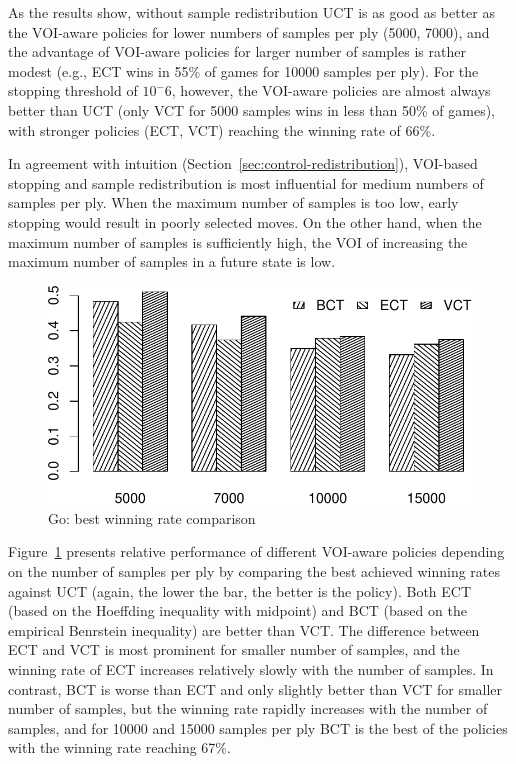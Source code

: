 \documentclass{article}
\begin{document}
As the results show, without sample redistribution UCT is as good as
better as the VOI-aware policies for lower numbers of samples per ply
(5000, 7000), and the advantage of VOI-aware policies for larger
number of samples is rather modest (e.g., ECT wins in 55\% of games for
10000 samples per ply). For the stopping threshold of $10^-6$,
however, the VOI-aware policies are almost always better than UCT
(only VCT for 5000 samples wins in less than 50\% of games), with
stronger policies (ECT, VCT) reaching the winning rate of 66\%.

In agreement with intuition
(Section~\ref{sec:control-redistribution}), VOI-based stopping and sample
redistribution is most influential for medium numbers of samples per
ply. When the maximum number of samples is too low, early stopping would
result in poorly selected moves. On the other hand, when the maximum
number of samples is sufficiently high, the VOI of increasing the
maximum number of samples in a future state is low.

\begin{figure}[h]
\centering
\includegraphics[scale=0.8]{bests-bw.pdf}
\caption{Go: best winning rate comparison}
\label{fig:best-winning-rate}
\end{figure}
Figure~\ref{fig:best-winning-rate} presents relative performance of
different VOI-aware policies depending on the number of samples per
ply by comparing the best achieved winning rates against UCT (again,
the lower the bar, the better is the policy). Both ECT (based on the
Hoeffding inequality with midpoint) and BCT (based on the empirical
Benrstein inequality) are better than VCT. The difference between ECT
and VCT is most prominent for smaller number of samples, and the
winning rate of ECT increases relatively slowly with the number of
samples. In contrast, BCT is worse than ECT and only slightly better
than VCT for smaller number of samples, but the winning rate rapidly
increases with the number of samples, and for 10000 and 15000 samples
per ply BCT is the best of the policies with the winning rate reaching
67\%.
\end{document}
